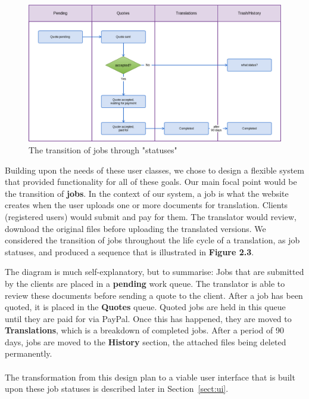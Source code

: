\documentclass{l3proj}
\begin{document}
\begin{figure}[h]
\label{fig:jobstatuses}
\centering
\includegraphics[width=\linewidth]{jobstatuses}
\caption{The transition of jobs through "statuses"}
\end{figure}

Building upon the needs of these user classes, we chose to design a flexible
system that provided functionality for all of these goals. Our main focal point
would be the transition of \textbf{jobs}. In the context of our system, a job is
what the website creates when the user uploads one or more documents for
translation. Clients (registered users) would submit and pay for them. The
translator would review, download the original files before uploading the
translated versions. We considered the
transition of jobs throughout the life cycle of a translation, as job statuses,
and produced a sequence that is illustrated in \textbf{Figure 2.3}. \newline

The diagram is much self-explanatory, but to summarise: Jobs that are submitted
by the clients are placed in a \textbf{pending} work queue. The translator is
able to review these documents before sending a quote to the client. After a job
has been quoted, it is placed in the \textbf{Quotes} queue. Quoted jobs are held
in this queue until they are paid for via PayPal. Once this has happened, they
are moved to \textbf{Translations}, which is a breakdown of completed jobs.
After a period of 90 days, jobs are moved to the \textbf{History}
section, the attached files being deleted permanently.\\
\\
The transformation from this design plan to a viable user interface that is
built upon these job statuses is described later in Section~\ref{sect:ui}.
\newline
\end{document}
